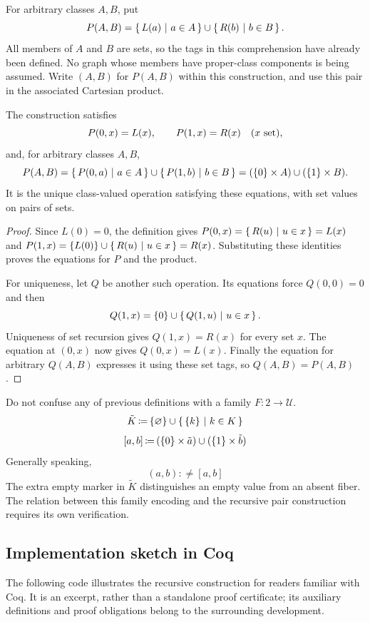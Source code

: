 \begin{definition}
For arbitrary classes $A,B$, put
\[
P(A,B)=\left\{\,L(a)\ \middle|\ a\in A\,\right\}\cup\left\{\,R(b)\ \middle|\ b\in B\,\right\}.
\label{def:recursive_class_pair}
\]
All members of $A$ and $B$ are sets, so the tags in this comprehension
have already been defined. No graph whose members have proper-class
components is being assumed. Write $(A,B)$ for $P(A,B)$ within this
construction, and use this pair in the associated Cartesian product.
\end{definition}

\begin{theorem}
The construction satisfies
\[
P(0,x)=L(x),\qquad P(1,x)=R(x)\quad(x\mathrm{\ set}),
\]
and, for arbitrary classes $A,B$,
\[
P(A,B)=\left\{\,P(0,a)\ \middle|\ a\in A\,\right\}\cup\left\{\,P(1,b)\ \middle|\ b\in B\,\right\}
       =(\{0\}\times A)\cup(\{1\}\times B).
\]
It is the unique class-valued operation satisfying these equations, with
set values on pairs of sets.
\end{theorem}
\begin{proof}
Since $L(0)=0$, the definition gives
$P(0,x)=\left\{\,R(u)\ \middle|\ u\in x\,\right\}=L(x)$ and
$P(1,x)=\{L(0)\}\cup\left\{\,R(u)\ \middle|\ u\in x\,\right\}=R(x)$.
Substituting these identities proves the equations for $P$ and the product.

For uniqueness, let $Q$ be another such operation. Its equations force
$Q(0,0)=0$ and then
\[
Q(1,x)=\{0\}\cup\left\{\,Q(1,u)\ \middle|\ u\in x\,\right\}.
\]
Uniqueness of set recursion gives $Q(1,x)=R(x)$ for every set $x$.
The equation at $(0,x)$ now gives $Q(0,x)=L(x)$. Finally the equation
for arbitrary $Q(A,B)$ expresses it using these set tags, so $Q(A,B)=P(A,B)$.
\end{proof}

\begin{remark}
Do not confuse any of previous definitions with a family $F:2\to\mathcal{U}$.
\[
\tilde{K}\,{\coloneqq}\, \{\varnothing\}\cup\left\{\,\{k\}\ \middle|\ k\in K\,\right\}
\]
\[
[a,b] \,{\coloneqq}\, (\{0\}\times \tilde{a})\cup (\{1\}\times \tilde{b})
\]
Generally speaking,
\[
(a,b) :\neq [a,b]
\]
The extra empty marker in $\tilde K$ distinguishes an empty value from an absent fiber. The relation between this family encoding and the recursive pair construction requires its own verification.
\end{remark}

\subsection{Implementation sketch in Coq}
The following code illustrates the recursive construction for readers familiar with Coq. It is an excerpt, rather than a standalone proof certificate; its auxiliary definitions and proof obligations belong to the surrounding development.


